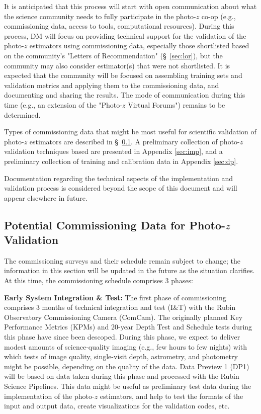 \documentclass[DM,lsstdraft,toc]{lsstdoc}
\begin{document}
It is anticipated that this process will start with open communication about what the science community needs to fully participate in the photo-$z$ co-op (e.g., commissioning data, access to tools, computational resources).
During this process, DM will focus on providing technical support for the validation of the photo-$z$ estimators using commissioning data, especially those shortlisted based on the community's "Letters of Recommendation" (\S~\ref{sec:lor}), but the community may also consider estimator(s) that were not shortlisted.
It is expected that the community will be focused on assembling training sets and validation metrics and applying them to the commissioning data, and documenting and sharing the results.
The mode of communication during this time (e.g., an extension of the "Photo-$z$ Virtual Forums") remains to be determined.

Types of commissioning data that might be most useful for scientific validation of photo-$z$ estimators are described in \S~\ref{ssec:pzcoop_commissioning}.
A preliminary collection of photo-$z$ validation techniques based are presented in Appendix \ref{sec:imp}, and a preliminary collection of training and calibration data in Appendix \ref{sec:dp}.

Documentation regarding the technical aspects of the implementation and validation process is considered beyond the scope of this document and will appear elsewhere in future.

\subsection{Potential Commissioning Data for Photo-$z$ Validation}\label{ssec:pzcoop_commissioning}

The commissioning surveys and their schedule remain subject to change; the information in this section will be updated in the future as the situation clarifies.
At this time, the commissioning schedule comprises 3 phases: 

{\bf Early System Integration \& Test:}
The first phase of commissioning comprises 3 months of technical integration and test (I\&T) with the Rubin Observatory Commissioning Camera (ComCam).
The originally planned Key Performance Metrics (KPMs) and 20-year Depth Test and Schedule tests during this phase have since been descoped. 
During this phase, we expect to deliver modest amounts of science-quality imaging (e.g., few hours to few nights) with which tests of image quality, single-visit depth, astrometry, and photometry might be possible, depending on the quality of the data.  
Data Preview 1 (DP1) will be based on data taken during this phase and processed with the Rubin Science Pipelines. 
This data might be useful as preliminary test data during the implementation of the photo-$z$ estimators, and help to test the formats of the input and output data, create visualizations for the validation codes, etc.
\end{document}
